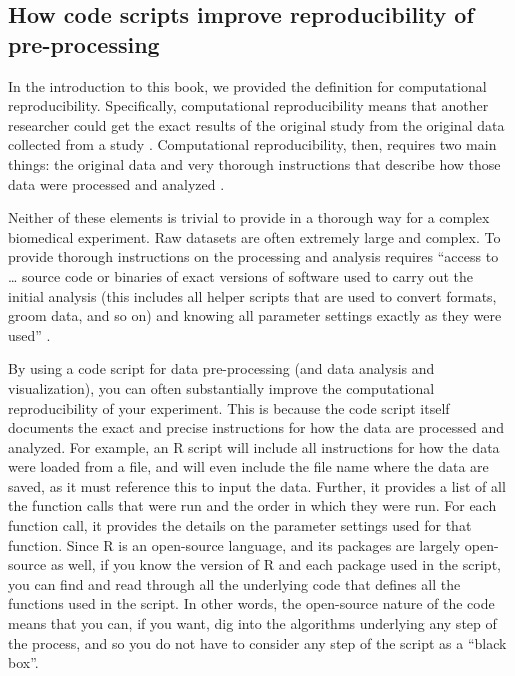 \documentclass[]{tufte-book}
\begin{document}
\subsection{How code scripts improve reproducibility of pre-processing}\label{how-code-scripts-improve-reproducibility-of-pre-processing}

In the introduction to this book, we provided the definition for computational
reproducibility. Specifically, computational reproducibility means
that another researcher could get the exact results of the original study from
the original data collected from a study \citep{stark2018before}. Computational
reproducibility, then, requires two main things: the original data and very
thorough instructions that describe how those data were processed and analyzed
\citep{nekrutenko2012next}.

Neither of these elements is trivial to provide in a thorough way for a complex
biomedical experiment. Raw datasets are often extremely large and complex. To
provide thorough instructions on the processing and analysis requires ``access to
\ldots{} source code or binaries of exact versions of software used to carry out the
initial analysis (this includes all helper scripts that are used to convert
formats, groom data, and so on) and knowing all parameter settings exactly as
they were used'' \citep{nekrutenko2012next}.

By using a code script for data pre-processing (and data analysis and
visualization), you can often substantially improve the computational
reproducibility of your experiment. This is because the code script itself
documents the exact and precise instructions for how the data are processed and
analyzed. For example, an R script will include all instructions for how the
data were loaded from a file, and will even include the file name where the data
are saved, as it must reference this to input the data. Further, it provides a
list of all the function calls that were run and the order in which they were
run. For each function call, it provides the details on the parameter settings
used for that function. Since R is an open-source language, and its packages are
largely open-source as well, if you know the version of R and each package used
in the script, you can find and read through all the underlying code that
defines all the functions used in the script. In other words, the open-source
nature of the code means that you can, if you want, dig into the algorithms
underlying any step of the process, and so you do not have to consider any step
of the script as a ``black box''.
\end{document}
